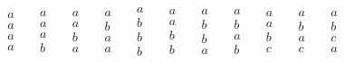 \documentclass[10pt,]{book}
\theoremstyle{plain}
\theoremstyle{definition}
\theoremstyle{definition}
\theoremstyle{definition}
\theoremstyle{definition}
\numberwithin{equation}{chapter}
\begin{document}
\begin{equation*}
\begin{matrix} a \\ a \\ a \\ a \end{matrix} \quad ~
\begin{matrix} a \\ a \\ a \\ b \end{matrix} \quad ~
\begin{matrix} a \\ a \\ b \\ a \end{matrix} \quad ~
\begin{matrix} a \\ b \\ a \\ a \end{matrix} \quad ~
\begin{matrix} a \\ b \\ b \\ b \end{matrix} \quad ~
\begin{matrix} a \\ a \\ b \\ b \end{matrix} \quad ~
\begin{matrix} a \\ b \\ b \\ a \end{matrix} \quad ~
\begin{matrix} a \\ b \\ a \\ b \end{matrix} \quad ~
\begin{matrix} a \\ a \\ b \\ c \end{matrix} \quad ~
\begin{matrix} a \\ b \\ a \\ c \end{matrix} \quad ~
\begin{matrix} a \\ b \\ c \\ a \end{matrix} \quad ~

\end{equation*}
\end{document}
